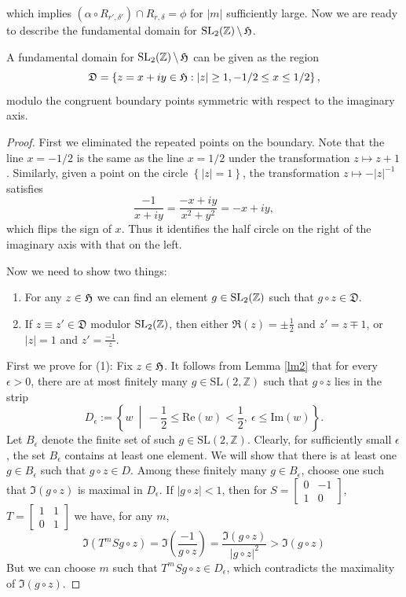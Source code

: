 which implies $(\alpha \circ R_{r',\delta'}) \cap R_{r,\delta} = \phi$ for $|m|$ sufficiently large.
Now we are ready to describe the fundamental domain for $\operatorname{SL_2(\mathbb{Z})} \backslash \operatorname{\mathfrak{H}}$.
\begin{prop}\label{prop2}
  A fundamental domain for $\operatorname{SL_2(\mathbb{Z})} \backslash \operatorname{\mathfrak{H}}$ can be given as the region
  \[\mathfrak{D} = \left\lbrace z=x+iy \in \operatorname{\mathfrak{H}}: |z| \ge 1,-1/2 \le x \le 1/2 \right\rbrace ,\]
  modulo the congruent boundary points symmetric with respect to the imaginary axis.
\end{prop}
\begin{proof}
  First we eliminated the repeated points on the boundary. Note that the line $x = -1/2$ is the same as
  the line $x=1/2$ under the transformation $z \mapsto z+1$. Similarly, given a point on the circle
  $\left\lbrace |z|=1\right\rbrace$, the transformation $z \mapsto -|z|^{-1}$ satisfies
  \[\dfrac{-1}{x+iy} = \dfrac{-x+iy}{x^2+y^2}=-x+iy,\]
  which flips the sign of $x$. Thus it identifies the half circle on the right of the imaginary axis with that on the left.

  Now we need to show two things:
  \begin{enumerate}
    \item For any $z \in \operatorname{\mathfrak{H}}$ we can find an element $g \in \operatorname{SL_2(\mathbb{Z})}$ such that $g\circ z \in \mathfrak{D}$.
    \item If $z \equiv z' \in \mathfrak{D}$ modulor $\operatorname{SL_2(\mathbb{Z})}$, then either $\Re(z)=\pm\frac{1}{2}$ and $z'=z\mp 1$, or
          $|z|=1$ and $z' = \frac{-1}{z} $.
  \end{enumerate}
  First we prove for (1): Fix $z \in \operatorname{\mathfrak{H}}$. It follows from Lemma \ref{lm2} that for every $\epsilon > 0$, there are at most finitely many $g \in \mathrm{SL}(2, \mathbb{Z})$ such that $g \circ z$ lies in the strip
  \[
    D_{\epsilon} := \left\{ w \ \middle|\ -\frac{1}{2} \leq \mathrm{Re}(w) < \frac{1}{2},\ \epsilon \leq \mathrm{Im}(w) \right\}.
  \]
  Let $B_{\epsilon}$ denote the finite set of such $g \in \mathrm{SL}(2, \mathbb{Z})$.
  Clearly, for sufficiently small $\epsilon$, the set $B_{\epsilon}$ contains at least one element. We will show that there is at least one $g \in B_{\epsilon}$ such that $g \circ z \in D$. Among these finitely many $g \in B_{\epsilon}$, choose one such that $\Im(g \circ z)$ is maximal in $D_{\epsilon}$.
  If $|g \circ z| < 1$, then for $S = \begin{bmatrix} 0 & -1 \\ 1 & 0 \end{bmatrix}$, $T=\begin{bmatrix} 1 & 1 \\ 0 & 1 \end{bmatrix}$
  we have, for any $m$,
  \[\Im\left( T^mS g \circ z \right)= \Im\left(\dfrac{-1}{g\circ z}\right)=\dfrac{\Im(g\circ z)}{|g\circ z|^2} > \Im(g\circ z)\]
  But we can choose $m$ such that $T^m S g\circ z \in D_\epsilon$, which contradicts the maximality of $\Im(g\circ z)$.


\end{proof}
